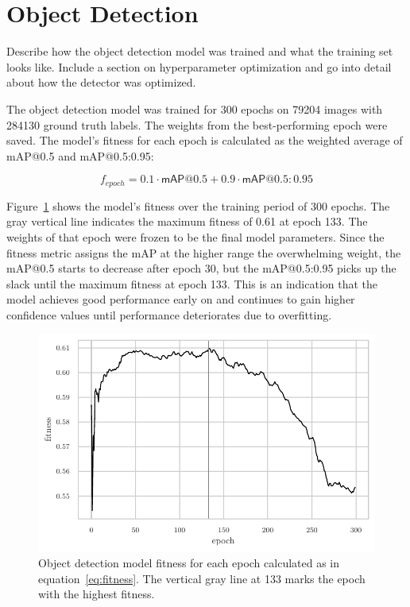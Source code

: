 \documentclass[draft,final]{vutinfth} %
\begin{document}
\section{Object Detection}
\label{sec:development-detection}

Describe how the object detection model was trained and what the
training set looks like. Include a section on hyperparameter
optimization and go into detail about how the detector was optimized.

The object detection model was trained for 300 epochs on 79204 images
with 284130 ground truth labels. The weights from the best-performing
epoch were saved. The model's fitness for each epoch is calculated as
the weighted average of \textsf{mAP}@0.5 and \textsf{mAP}@0.5:0.95:

\begin{equation}
  \label{eq:fitness}
  f_{epoch} = 0.1 \cdot \mathsf{mAP}@0.5 + 0.9 \cdot \mathsf{mAP}@0.5\mathrm{:}0.95
\end{equation}

Figure~\ref{fig:fitness} shows the model's fitness over the training
period of 300 epochs. The gray vertical line indicates the maximum
fitness of 0.61 at epoch 133. The weights of that epoch were frozen to
be the final model parameters. Since the fitness metric assigns the
\textsf{mAP} at the higher range the overwhelming weight, the
\textsf{mAP}@0.5 starts to decrease after epoch 30, but the
\textsf{mAP}@0.5:0.95 picks up the slack until the maximum fitness at
epoch 133. This is an indication that the model achieves good
performance early on and continues to gain higher confidence values
until performance deteriorates due to overfitting.

\begin{figure}
  \centering
  \includegraphics{graphics/model_fitness.pdf}
  \caption[Object detection fitness per epoch.]{Object detection model
    fitness for each epoch calculated as in
    equation~\ref{eq:fitness}. The vertical gray line at 133 marks the
    epoch with the highest fitness.}
  \label{fig:fitness}
\end{figure}
\end{document}
